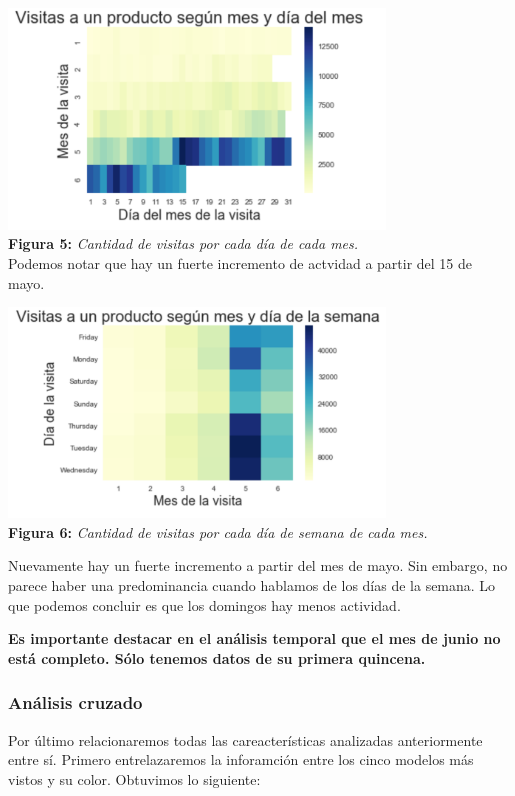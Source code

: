 \documentclass[titlepage,a4paper]{article}
\begin{document}
	\begin{center}
	\includegraphics[width=10cm]{visitasSegunmesDiaMes.jpg}\\
	\textbf{Figura 5:}  \textit{Cantidad de visitas por cada día de cada mes. }\\
	Podemos notar que hay un fuerte incremento de actvidad a partir del 15 de mayo. 
	
	\end{center}
	\begin{center}
	\includegraphics[width=10cm]{visitasSegunMesYDiaDeSemana.jpg}\\
	\textbf{Figura 6:}  \textit{Cantidad de visitas por cada día de semana de cada mes.   }
	\end{center}
	Nuevamente hay un fuerte incremento a partir del mes de mayo. Sin embargo, no parece haber una predominancia cuando hablamos de los días de la semana. Lo que podemos concluir es que los domingos hay menos actividad. 
	
	\textbf{Es importante destacar en el análisis temporal que el mes de  junio no está completo. Sólo tenemos datos de su primera quincena. }
	
	\subsubsection{Análisis cruzado}
	Por último relacionaremos todas las careacterísticas analizadas anteriormente entre sí. Primero entrelazaremos la inforamción entre los cinco modelos más vistos y su color. Obtuvimos lo siguiente:
\end{document}
